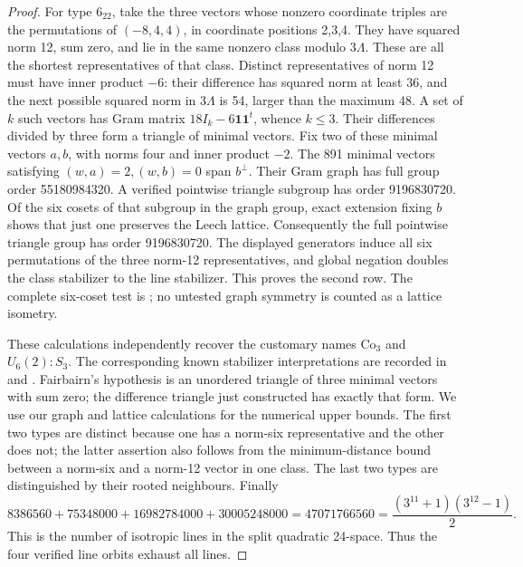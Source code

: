 \begin{proof}
For type \(6_{22}\), take the three vectors whose nonzero coordinate
triples are the permutations of \((-8,4,4)\), in coordinate
positions 2,3,4. They have squared norm 12, sum zero, and lie in the
same nonzero class modulo \(3\Lambda\). These are all the shortest
representatives of that class. Distinct representatives of norm 12
must have inner product \(-6\): their difference has squared norm
at least 36, and the next possible squared norm in \(3\Lambda\)
is 54, larger than the maximum 48. A set of \(k\) such vectors has
Gram matrix \(18I_k-6\mathbf1\mathbf1^t\), whence \(k\le3\).
Their differences divided by three form a triangle of minimal
vectors. Fix two of these minimal vectors \(a,b\), with norms four
and inner product \(-2\). The 891 minimal vectors satisfying
\((w,a)=2,(w,b)=0\) span \(b^\perp\). Their Gram graph has full
group order 55180984320. A verified pointwise triangle subgroup has
order 9196830720. Of the six cosets of that subgroup in the graph
group, exact extension fixing \(b\) shows that just one preserves
the Leech lattice. Consequently the full pointwise triangle group
has order 9196830720. The displayed generators induce all six
permutations of the three norm-12 representatives, and global
negation doubles the class stabilizer to the line stabilizer.
This proves the second row. The complete six-coset test is
; no untested graph symmetry is counted as
a lattice isometry.

These calculations independently recover the customary names
\(\mathrm{Co}_3\) and \(U_6(2):S_3\). The corresponding known
stabilizer interpretations are recorded in
\citet[Section 2]{B_BrouwerLeech} and
\citet[Section 5, p.~10, statement preceding Corollary 7]{B_Fairbairn2010}.
Fairbairn's hypothesis is an unordered triangle of three minimal
vectors with sum zero; the difference triangle just constructed
has exactly that form. We use our graph and lattice calculations
for the numerical upper bounds. The first two types are distinct
because one has a norm-six representative and the other does not;
the latter assertion also follows from the minimum-distance bound
between a norm-six and a norm-12 vector in one class. The last two
types are distinguished by their rooted neighbours. Finally
\[
 8386560+75348000+16982784000+30005248000
 =47071766560
 =\frac{(3^{11}+1)(3^{12}-1)}2.
\]
This is the number of isotropic lines in the split quadratic
24-space. Thus the four verified line orbits exhaust all lines.


\end{proof}
